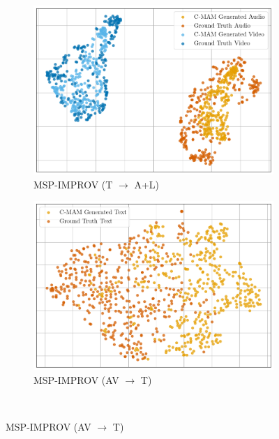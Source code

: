 \begin{figure}[!p]
\begin{subfigure}[b]{0.24\textwidth}
        \includegraphics[width=\textwidth]{imgs/tsne/mmin/msp_improv/cmam_text_tsne.png}
        \caption*{MSP-IMPROV (T $\rightarrow$ A+L)}
    \end{subfigure}
    \begin{subfigure}[b]{0.24\textwidth}
        \centering
        \includegraphics[width=\textwidth]{imgs/tsne/mmin/msp_improv/cmam_text_tsne_av.png}
        \caption*{MSP-IMPROV (AV $\rightarrow$ T)}
    \end{subfigure}
    \\
    \centering


\end{figure}
